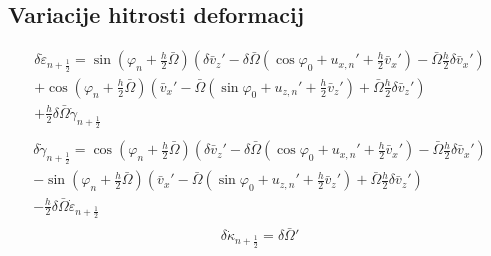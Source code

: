 \documentclass[a4paper,6pt]{article}
\begin{document}
\begin{flushleft}
\subsection{Variacije hitrosti deformacij}
\begin{multline}
\delta\dot{\varepsilon}_{n+\frac{1}{2}} = \sin(\varphi_n +\frac{h}{2}\bar{\Omega})(\delta\bar{v}_z'-\delta\bar{\Omega}(\cos\varphi_0 +u_{x,n}' +\frac{h}{2}\bar{v}_x')-\bar{\Omega}\frac{h}{2}\delta\bar{v}_x')\\
                                        +\cos(\varphi_n +\frac{h}{2}\bar{\Omega})(\bar{v}_x'-\bar{\Omega}(\sin\varphi_0 +u_{z,n}' +\frac{h}{2}\bar{v}_z')+\bar{\Omega}\frac{h}{2}\delta\bar{v}_z')\\
                                        +\frac{h}{2}\delta\bar{\Omega}\dot{\gamma}_{n+\frac{1}{2}}\\
\end{multline}
\begin{multline}
\delta\dot{\gamma}_{n+\frac{1}{2}} = \cos(\varphi_n +\frac{h}{2}\bar{\Omega})(\delta\bar{v}_z'-\delta\bar{\Omega}(\cos\varphi_0 +u_{x,n}' +\frac{h}{2}\bar{v}_x')-\bar{\Omega}\frac{h}{2}\delta\bar{v}_x')\\
                                        -\sin(\varphi_n +\frac{h}{2}\bar{\Omega})(\bar{v}_x'-\bar{\Omega}(\sin\varphi_0 +u_{z,n}' +\frac{h}{2}\bar{v}_z')+\bar{\Omega}\frac{h}{2}\delta\bar{v}_z')\\
                                        -\frac{h}{2}\delta\bar{\Omega}\dot{\varepsilon}_{n+\frac{1}{2}}\\
\end{multline}
\begin{equation}
  \delta\dot{\kappa}_{n+\frac{1}{2}} =\delta \bar{\Omega}'
\end{equation}



\end{flushleft}
\end{document}
